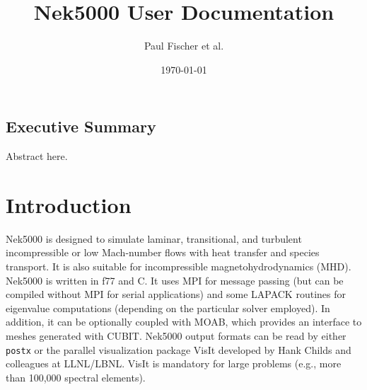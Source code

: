 \documentclass[11pt]{report}              %
\title{Nek5000 User Documentation}    %
\author{Paul Fischer et al.}              %
\date{\today}                           %
\begin{document}

\maketitle
\clearpage
\thispagestyle{empty}
\tableofcontents
\clearpage

\section*{Executive Summary} 


Abstract here.

\newpage

\setcounter{page}{1}

\chapter{Introduction}

Nek5000 is designed to simulate laminar, transitional, and turbulent
incompressible or low Mach-number flows with heat transfer and species
transport. It is also suitable for incompressible magnetohydrodynamics
(MHD). Nek5000 is written in f77 and C. It uses MPI for message passing
(but can be compiled without MPI for serial applications)
and some LAPACK routines for eigenvalue computations (depending on
the particular solver employed).  In addition, it can be optionally
coupled with MOAB, which provides an interface to meshes generated with 
CUBIT. Nek5000 output formats can be read by either {\tt postx} or the parallel visualization 
package VisIt developed by Hank Childs and colleagues at LLNL/LBNL.
VisIt is mandatory for large problems (e.g., more than 100,000 
spectral elements).
\end{document}
